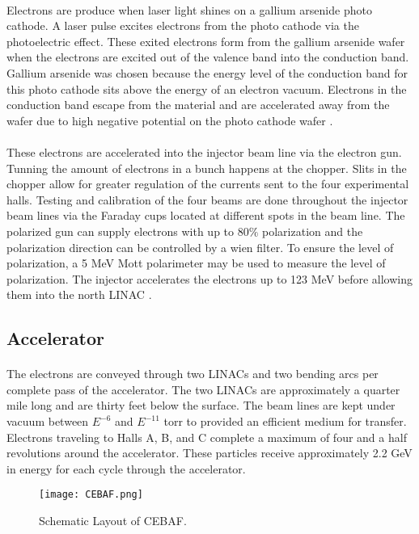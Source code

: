 	\paragraph{}Electrons are produce when laser light shines on a gallium arsenide photo cathode. A laser pulse excites electrons from the photo cathode via the photoelectric effect. These exited electrons form from the gallium arsenide wafer when the electrons are excited out of the valence band into the conduction band. Gallium arsenide was chosen because the energy level of the conduction band for this photo cathode sits above the energy of an electron vacuum. Electrons in the conduction band  escape from the material and are accelerated away from the wafer due to high negative potential on the photo cathode wafer \cite{sane}. 
	\paragraph{}These electrons are accelerated into the injector beam line via the electron gun. Tunning the amount of electrons in a bunch happens at the chopper. Slits in the chopper allow for greater regulation of the currents sent to the four experimental halls. Testing and calibration of the four beams are done throughout the injector beam lines via the Faraday cups located at different spots in the beam line. The polarized gun can supply electrons with up to 80$\%$ polarization and the polarization direction can be controlled by a wien filter. To ensure the level of polarization, a 5 MeV Mott polarimeter may be used to measure the level of polarization\cite{HallA}. The injector accelerates the electrons up to 123 MeV before allowing them into the north LINAC	\cite{CEBAF,ref:photogun,ref:4beams}.
\subsection{Accelerator}
	\paragraph{} The electrons are conveyed through two LINACs and two bending arcs per complete pass of the accelerator. The two LINACs are approximately a quarter mile long and are thirty feet below the surface. The beam lines are kept under vacuum between $E^{-6}$ and $E^{-11}$ torr to provided an efficient medium for transfer.  Electrons traveling to Halls A, B, and C complete a maximum of four and a half revolutions around the accelerator. These particles receive approximately 2.2 GeV in energy for each cycle through the accelerator. 
	\begin{figure}[h]
		\centering
		\caption{Schematic Layout of CEBAF. }
		\label{CEBAF}
		\texttt{[image: CEBAF.png]} 
	\end{figure} 
